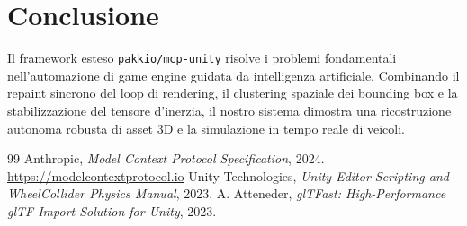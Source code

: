 \documentclass[11pt,a4paper]{article}
\begin{document}
\section{Conclusione}
Il framework esteso \texttt{pakkio/mcp-unity} risolve i problemi fondamentali nell'automazione di game engine guidata da intelligenza artificiale. Combinando il repaint sincrono del loop di rendering, il clustering spaziale dei bounding box e la stabilizzazione del tensore d'inerzia, il nostro sistema dimostra una ricostruzione autonoma robusta di asset 3D e la simulazione in tempo reale di veicoli.

\begin{thebibliography}{99}
 Anthropic, \textit{Model Context Protocol Specification}, 2024. \url{https://modelcontextprotocol.io}
 Unity Technologies, \textit{Unity Editor Scripting and WheelCollider Physics Manual}, 2023.
 A. Atteneder, \textit{glTFast: High-Performance glTF Import Solution for Unity}, 2023.
\end{thebibliography}
\end{document}
